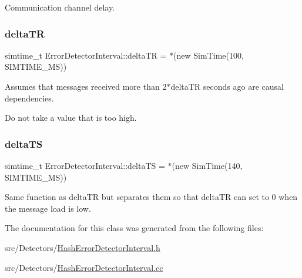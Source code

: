 Communication channel delay. 

\mbox{\label{class_error_detector_interval_a24f229a469ae7c4314a948015cddb277}} 
\subsubsection{\texorpdfstring{delta\+TR}{deltaTR}}
{\footnotesize\ttfamily simtime\+\_\+t Error\+Detector\+Interval\+::delta\+TR = $\ast$(new Sim\+Time(100, S\+I\+M\+T\+I\+M\+E\+\_\+\+MS))\hspace{0.3cm}{\ttfamily [private]}}



Assumes that messages received more than 2$\ast$delta\+TR seconds ago are causal dependencies. 

Do not take a value that is too high. \mbox{\label{class_error_detector_interval_a2368ba76496cfd25487e150a961bb08b}} 
\subsubsection{\texorpdfstring{delta\+TS}{deltaTS}}
{\footnotesize\ttfamily simtime\+\_\+t Error\+Detector\+Interval\+::delta\+TS = $\ast$(new Sim\+Time(140, S\+I\+M\+T\+I\+M\+E\+\_\+\+MS))\hspace{0.3cm}{\ttfamily [private]}}



Same function as delta\+TR but separates them so that delta\+TR can set to 0 when the message load is low. 



The documentation for this class was generated from the following files\+:\begin{DoxyCompactItemize}
\item 
src/\+Detectors/\hyperlink{_hash_error_detector_interval_8h}{Hash\+Error\+Detector\+Interval.\+h}\item 
src/\+Detectors/\hyperlink{_hash_error_detector_interval_8cc}{Hash\+Error\+Detector\+Interval.\+cc}\end{DoxyCompactItemize}
